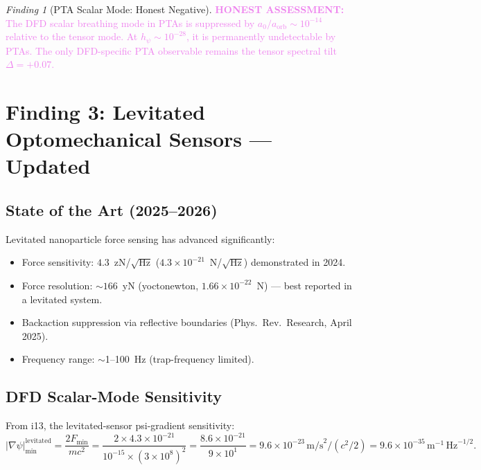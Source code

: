 \documentclass[11pt]{article}
\theoremstyle{definition}
\theoremstyle{remark}
\newtheorem{finding}[theorem]{Finding}
\newcommand{\ee}[1]{\times10^{#1}}
\newcommand{\sqrtHz}{\,\mathrm{Hz}^{-1/2}}
\newcommand{\azero}{a_0}
\newcommand{\honest}[1]{\textcolor{violet}{\textbf{HONEST ASSESSMENT:} #1}}
\begin{document}
\begin{finding}[PTA Scalar Mode: Honest Negative]
\label{find:pta-scalar}
\honest{The DFD scalar breathing mode in PTAs is suppressed by
$\azero / a_{\mathrm{orb}} \sim 10^{-14}$ relative to the tensor
mode. At $h_\psi \sim 10^{-28}$, it is permanently undetectable
by PTAs. The only DFD-specific PTA observable remains the tensor
spectral tilt $\Delta = +0.07$.}
\end{finding}

\section{Finding 3: Levitated Optomechanical Sensors --- Updated}
\label{sec:levitated}

\subsection{State of the Art (2025--2026)}

Levitated nanoparticle force sensing has advanced significantly:
\begin{itemize}[nosep]
\item Force sensitivity: $4.3$~zN/$\sqrt{\mathrm{Hz}}$
  ($4.3\ee{-21}$~N/$\sqrt{\mathrm{Hz}}$) demonstrated in 2024.
\item Force resolution: $\sim 166$~yN (yoctonewton, $1.66\ee{-22}$~N)
  --- best reported in a levitated system.
\item Backaction suppression via reflective boundaries
  (Phys.\ Rev.\ Research, April 2025).
\item Frequency range: $\sim$1--100~Hz (trap-frequency limited).
\end{itemize}

\subsection{DFD Scalar-Mode Sensitivity}

From i13, the levitated-sensor psi-gradient sensitivity:
\begin{equation}
|\nabla\psi|_{\min}^{\mathrm{levitated}} = \frac{2 F_{\min}}{m c^2}
= \frac{2 \times 4.3\ee{-21}}{10^{-15} \times (3\ee{8})^2}
= \frac{8.6\ee{-21}}{9\ee{1}}
= 9.6\ee{-23}\,\mathrm{m/s}^2 / (c^2/2)
= 9.6\ee{-35}\,\mathrm{m}^{-1}\sqrtHz.
\label{eq:levitated-sensitivity}
\end{equation}
\end{document}
